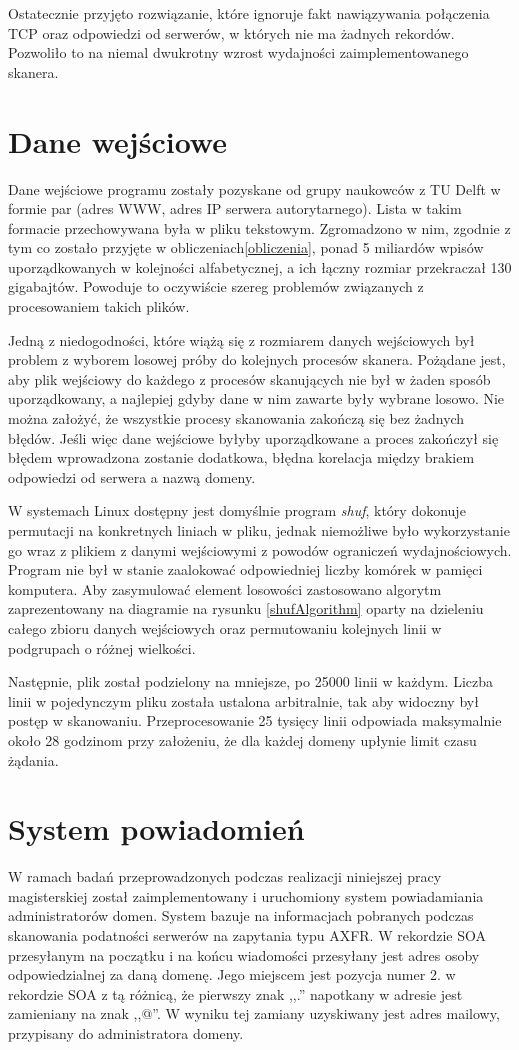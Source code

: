 Ostatecznie przyjęto rozwiązanie, które ignoruje fakt nawiązywania połączenia TCP oraz odpowiedzi od serwerów, w których nie ma
żadnych rekordów. Pozwoliło to na niemal dwukrotny wzrost wydajności zaimplementowanego skanera.

\section{Dane wejściowe}
Dane wejściowe programu zostały pozyskane od grupy naukowców z TU Delft\cite{delft} w formie par (adres WWW, adres IP serwera
autorytarnego). Lista w takim formacie przechowywana była w pliku tekstowym. Zgromadzono w nim, zgodnie z tym co zostało przyjęte
w obliczeniach\ref{obliczenia}, ponad 5 miliardów wpisów uporządkowanych w kolejności alfabetycznej, a ich łączny rozmiar przekraczał
130 gigabajtów. Powoduje to oczywiście szereg problemów związanych z procesowaniem takich plików.

Jedną z niedogodności, które wiążą się z rozmiarem danych wejściowych był problem z wyborem losowej próby do kolejnych procesów
skanera. Pożądane jest, aby plik wejściowy do każdego z procesów skanujących nie był w żaden sposób uporządkowany, a najlepiej
gdyby dane w nim zawarte były wybrane losowo. Nie można założyć, że wszystkie procesy skanowania zakończą się bez żadnych błędów.
Jeśli więc dane wejściowe byłyby uporządkowane a proces zakończył się błędem wprowadzona zostanie dodatkowa, błędna korelacja między
brakiem odpowiedzi od serwera a nazwą domeny.

W systemach Linux dostępny jest domyślnie program \textit{shuf}\cite{shuf}, który dokonuje permutacji na konkretnych liniach w pliku,
jednak niemożliwe było wykorzystanie go wraz z plikiem z danymi wejściowymi z powodów ograniczeń wydajnościowych. Program nie był w
stanie zaalokować odpowiedniej liczby komórek w pamięci komputera. Aby zasymulować element losowości zastosowano algorytm zaprezentowany
na diagramie na rysunku \ref{shufAlgorithm} oparty na dzieleniu całego zbioru danych wejściowych oraz permutowaniu kolejnych linii
w podgrupach o różnej wielkości.

Następnie, plik został podzielony na mniejsze, po 25000 linii w każdym. Liczba linii w pojedynczym pliku została ustalona arbitralnie,
tak aby widoczny był postęp w skanowaniu. Przeprocesowanie 25 tysięcy linii odpowiada maksymalnie około 28 godzinom przy założeniu,
że dla każdej domeny upłynie limit czasu żądania.

\section{System powiadomień}
W ramach badań przeprowadzonych podczas realizacji niniejszej pracy magisterskiej został zaimplementowany i uruchomiony system
powiadamiania administratorów domen. System bazuje na informacjach pobranych podczas skanowania podatności serwerów na zapytania
typu AXFR. W rekordzie SOA przesyłanym na początku i na końcu wiadomości przesyłany jest adres osoby odpowiedzialnej za daną domenę.
Jego miejscem jest pozycja numer 2. w rekordzie SOA z tą różnicą, że pierwszy znak ,,.'' napotkany w adresie jest zamieniany na
znak ,,@''. W wyniku tej zamiany uzyskiwany jest adres mailowy, przypisany do administratora domeny.

